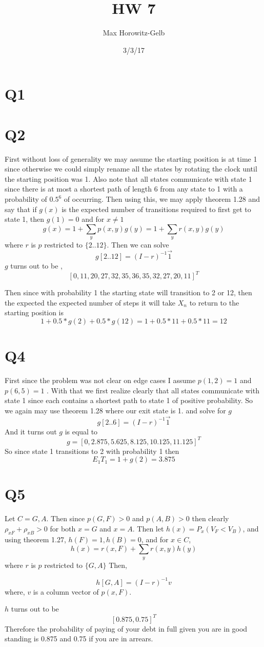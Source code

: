 \documentclass{article}
\title{HW 7}
\author{Max Horowitz-Gelb}
\date{3/3/17}
\begin{document}
\maketitle
\section*{Q1}
\section*{Q2}
First without loss of generality we may assume the starting position is at time 1 since otherwise we could simply rename all the states by rotating the clock until the starting position was 1. Also note that all states communicate with state 1 since there is at most a shortest path of length 6 from any state to 1 with a probability of $0.5^{6}$ of occurring.
Then using this, we may apply theorem 1.28 and say that
if $g(x)$ is the expected number of transitions required to first get to state 1, then
$g(1) = 0$ and for $x \neq 1$
\[
g(x) = 1 + \sum_y p(x,y)g(y) = 1 + \sum_y r(x,y)g(y)
\]
where $r$ is $p$ restricted to $\{2 .. 12\}$.
Then we can solve
\[
g[2 .. 12] = (I - r)^{-1} \vec{1}
\]
$g$ turns out to be ,
\[
[0, 11,  20,  27,  32,  35,  36,  35,  32,  27,  20,  11]^T
\]

Then since with probability 1 the starting state will transition to 2 or 12, then the expected the expected number of steps it will take $X_n$ to return to the starting position is
\[
1 + 0.5 * g(2) + 0.5 * g(12) = 1 + 0.5 * 11 + 0.5 * 11 = 12
\]

\section*{Q4}
First since the problem was not clear on edge cases I assume $p(1,2) = 1$ and $p(6,5) = 1$ . With that we first realize clearly that all states communicate with state 1 since each contains a shortest path to state 1 of positive probability. 
So we again may use theorem 1.28 where our exit state is 1. 
and solve for $g$
\[
g[2 .. 6] = (I - r)^{-1} \vec{1}
\]
And it turns out $g$ is equal to 
\[
g = [0 , 2.875,   5.625,   8.125,  10.125,  11.125]^T
\]
So since state 1 transitions to 2 with probability 1 then
\[
E_1T_1 = 1 + g(2) = 3.875
\]

\section*{Q5}
Let $C = {G,A}$. Then since $p(G,F) > 0$ and $p(A,B) > 0$ then clearly $\rho_{xF} + \rho_{xB} > 0 $ for both $x = G$ and $x= A$.
Then let $h(x) = P_x(V_F < V_B)$, and using theorem 1.27,
$h(F) = 1, h(B) = 0$, and for $x \in C$,
\[
h(x) = r(x,F) + \sum_y r(x,y)h(y)
\]
where $r$ is $p$ restricted to $\{G,A\}$
Then,

\[
h[G,A] = (I - r)^{-1}v
\]
where, $v$ is a column vector of $p(x,F)$.

$h$ turns out to be
\[
[ 0.875,  0.75 ]^T
\]
Therefore the probability of paying of your debt in full given you are in good standing is 0.875 and 0.75 if you are in arrears. 
\end{document}
